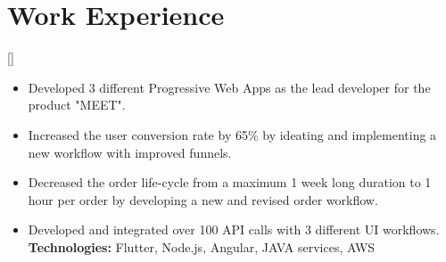 \documentclass{article}
\begin{document}
\section{Work Experience}

[]
\begin{itemize}
    \item Developed 3 different Progressive Web Apps as the lead developer for the product "MEET".
    \item Increased the user conversion rate by 65\% by ideating and implementing a new workflow with improved funnels.
    \item Decreased the order life-cycle from a maximum 1 week long duration to 1 hour per order by developing a new and revised order workflow.
    \item Developed and integrated over 100 API calls with 3 different UI workflows.\\
\textbf{Technologies:} Flutter, Node.js, Angular, JAVA services, AWS 

\end{itemize}



\end{document}
